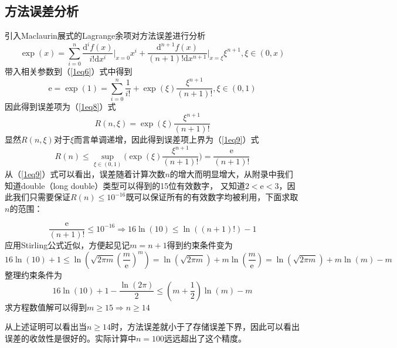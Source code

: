 \documentclass[onecolumn,compsoc]{IEEEtran}
\renewcommand{\d}{\mathrm{d}}
\renewcommand{\|}{\Bigg |}
\newcommand{\e}{\mathrm{e}}
\begin{document}
\subsection{方法误差分析}
引入Maclaurin展式的Lagrange余项对方法误差进行分析
\begin{equation}\label{1eq6}
\exp(x) = \sum_{i=0}^n \frac{\d^if(x)}{i!\d x^i}\|_{x = 0}x^i + \frac{\d^{n+1}f(x)}{(n+1)!\d x^{n+1}}\|_{x = \xi}\xi^{n+1}, \xi \in(0,x)
\end{equation}
带入相关参数到（\ref{1eq6}）式中得到
\begin{equation}\label{1eq7}
\e=\exp(1)=\sum_{i=0}^n \frac{1}{i!} + \exp(\xi)\frac{\xi^{n+1}}{(n+1)!}, \xi\in(0,1)
\end{equation}
因此得到误差项为（\ref{1eq8}）式
\begin{equation}\label{1eq8}
R(n,\xi) = \exp(\xi)\frac{\xi^{n+1}}{(n+1)!}
\end{equation}
显然$R(n,\xi)$对于$\xi$而言单调递增，因此得到误差项上界为（\ref{1eq9}）式
\begin{equation}\label{1eq9}
R(n) \le \sup_{\xi\in(0,1)}\bigg(\exp(\xi)\frac{\xi^{n+1}}{(n+1)!}\bigg) = \frac{\e}{(n+1)!}
\end{equation}
从（\ref{1eq9}）式可以看出，误差随着计算次数$n$的增大而明显增大，从附录中我们知道double（long double）类型可以得到的15位有效数字，
又知道$2 < \e < 3$，因此我们只需要保证$R(n) \le 10^{-16}$既可以保证所有的有效数字均被利用，下面求取$n$的范围：

\begin{IEEEproof}[$n$范围的求取]

$$\frac{\e}{(n+1)!} \le 10^{-16} \Rightarrow 16\ln(10) \le \ln((n+1)!) - 1$$ 
应用Stirling公式近似，方便起见记$m = n+ 1$得到约束条件变为
$$16\ln(10) + 1 \le \ln(\sqrt{2\pi m}(\frac{m}{\e})^m) = \ln(\sqrt{2\pi m}) + m\ln(\frac{m}{\e}) = \ln(\sqrt{2\pi m}) + m\ln(m) - m$$
整理约束条件为$$16\ln(10) + 1 -\frac{\ln(2\pi)}{2}\le (m+\frac{1}{2})\ln(m) - m$$
求方程数值解可以得到$m \ge  15 \Rightarrow n \ge 14$
\end{IEEEproof}	
从上述证明可以看出当$n \ge 14$时，方法误差就小于了存储误差下界，因此可以看出误差的收敛性是很好的。实际计算中$n = 100$远远超出了这个精度。
\end{document}
